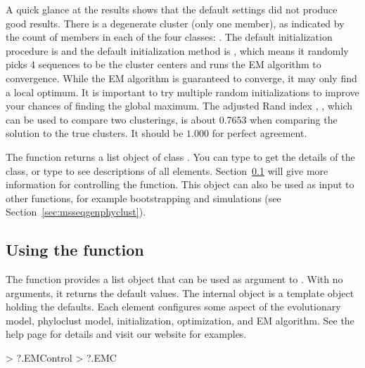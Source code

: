 A quick glance at the results shows that the default settings did not produce good results.
There is a degenerate cluster (only one member), as indicated by the count of members in each of the four classes: .
The default initialization procedure
is  and the default initialization method is ,
which means it randomly picks 4 sequences to be the cluster centers and
runs the EM algorithm to convergence. While the EM algorithm is guaranteed to converge, it may only find a local optimum.
It is important to try multiple random initializations to improve your chances of finding the global maximum.
The adjusted Rand index \citep{Hubert1985}, , which can be used to compare two clusterings, is about 0.7653 when comparing the  solution to the true clusters.
It should be $1.000$ for perfect agreement.

The  function returns a list object of class
{\color{red} }.
You can type  to get the details of the 
class, or type  to see descriptions of all elements.
Section~\ref{sec:emcontrol} will give more information for controlling
the  function.
This object can also be used as input to other functions, for example bootstrapping
and simulations (see Section~\ref{sec:msseqgenphyclust}).




\subsection[Using the .EMControl() function]{Using the  function}
\label{sec:emcontrol}

The  function provides a list object that can be used as argument  to .
With no arguments, it returns the default values. The internal object 
is a template object holding the defaults. Each element configures some aspect of the evolutionary model,
phyloclust model, initialization, optimization, and EM algorithm. See the help
page for details and visit our website for examples.
\begin{Code}
> ?.EMControl
> ?.EMC
\end{Code}


